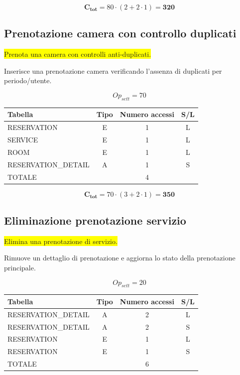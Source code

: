 \documentclass[a4paper,12pt]{report}
\begin{document}
$$\mathbf{C_{tot}} = 80 \cdot (2 + 2 \cdot 1) = \mathbf{320}$$

\subsection*{Prenotazione camera con controllo duplicati} \label{op15}
\colorbox{yellow}{Prenota una camera con controlli anti-duplicati.}

Inserisce una prenotazione camera verificando l'assenza di duplicati
per periodo/utente.

$$Op_{sett} = 70$$

\begin{table}[H]
  \centering
  \small
  \renewcommand{\arraystretch}{1.15}
  \begin{tabularx}{0.8\textwidth}{|X|c|c|c|}
    \hline
    \rowcolor{gray!20}
    \textbf{Tabella} & \textbf{Tipo} & \textbf{Numero accessi} & \textbf{S/L} \\
    \hline
    RESERVATION & E & 1 & L \\
    SERVICE & E & 1 & L \\
    ROOM & E & 1 & L \\
    RESERVATION\_DETAIL & A & 1 & S \\
    \hline
    \rowcolor{gray!20}
    TOTALE & & 4 & \\
    \hline
  \end{tabularx}
  \vspace{-1em}
\end{table}

$$\mathbf{C_{tot}} = 70 \cdot (3 + 2 \cdot 1) = \mathbf{350}$$

\subsection*{Eliminazione prenotazione servizio} \label{op16}
\colorbox{yellow}{Elimina una prenotazione di servizio.}

Rimuove un dettaglio di prenotazione e aggiorna lo stato della
prenotazione principale.

$$Op_{sett} = 20$$

\begin{table}[H]
  \centering
  \small
  \renewcommand{\arraystretch}{1.15}
  \begin{tabularx}{0.8\textwidth}{|X|c|c|c|}
    \hline
    \rowcolor{gray!20}
    \textbf{Tabella} & \textbf{Tipo} & \textbf{Numero accessi} & \textbf{S/L} \\
    \hline
    RESERVATION\_DETAIL & A & 2 & L \\
    RESERVATION\_DETAIL & A & 2 & S \\
    RESERVATION & E & 1 & L \\
    RESERVATION & E & 1 & S \\
    \hline
    \rowcolor{gray!20}
    TOTALE & & 6 & \\
    \hline
  \end{tabularx}
  \vspace{-1em}
\end{table}
\end{document}
